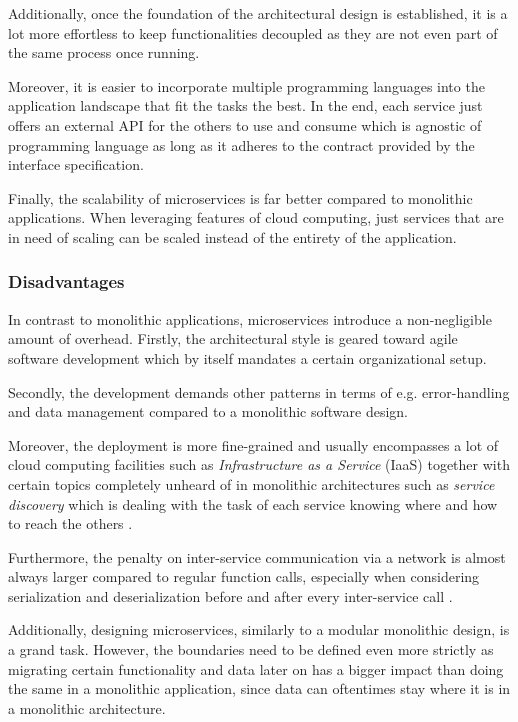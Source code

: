 \documentclass[12pt,a4paper]{report}
\begin{document}
Additionally, once the foundation of the architectural design is established,
it is a lot more effortless to keep functionalities decoupled as
they are not even part of the same process once running.

Moreover, it is easier to incorporate multiple programming languages into
the application landscape that fit the tasks the best.
In the end, each service just offers an external API for the others to use
and consume which is agnostic of programming language as long as it adheres
to the contract provided by the interface specification.

Finally, the scalability of microservices is far better compared to monolithic
applications. When leveraging features of cloud computing, just services
that are in need of scaling can be scaled instead of the entirety of the application.


\subsubsection{Disadvantages}
In contrast to monolithic applications, microservices introduce a non\hyp negligible
amount of overhead. Firstly, the architectural style is geared toward
agile software development which by itself mandates a certain organizational setup.

Secondly, the development demands other patterns in terms of e.g.
error-handling and data management compared to a monolithic software design.

Moreover, the deployment is more fine-grained and usually encompasses a lot of
cloud computing facilities such as \textit{Infrastructure as a Service} (IaaS)
together with certain topics completely unheard of in monolithic architectures
such as \textit{service discovery} which is dealing with the task of each
service knowing where and how to reach the others \cite{newman2015building}.

Furthermore, the penalty on inter-service communication via a network is almost
always larger compared to regular function calls, especially when considering
serialization and deserialization before and after every inter-service call
\cite{knoche2016sustaining, newman2015building}.

Additionally, designing microservices, similarly to a modular monolithic design,
is a grand task. However, the boundaries need to be defined even more strictly
as migrating certain functionality and data later on has a bigger impact than
doing the same in a monolithic application, since data can oftentimes
stay where it is in a monolithic architecture.
\end{document}
